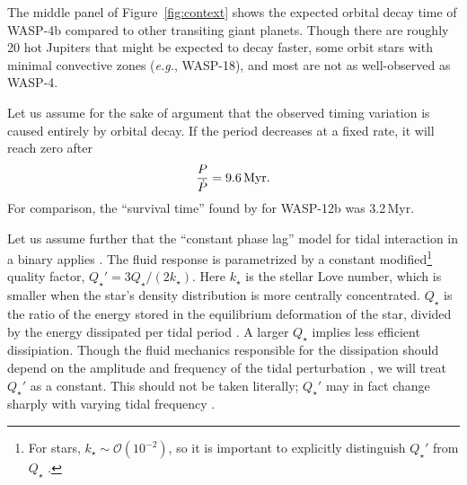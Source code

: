 \documentclass[12pt,twocolumn,tighten]{aastex62}
\begin{document}
The middle panel of Figure~\ref{fig:context} shows the expected
orbital decay time of WASP-4b compared to other transiting giant
planets.  Though there are roughly 20 hot Jupiters that might be
expected to decay faster, some orbit stars with minimal convective zones
({\it e.g.}, WASP-18), and most are not as well-observed as
WASP-4.

Let us assume for the sake of argument that the observed timing
variation is caused entirely by orbital decay.  If the period
decreases at a fixed rate, it will reach zero after
\begin{equation}
  \frac{P}{ \dot{P} } = 9.6 \, {\rm Myr}.
\end{equation}
For comparison, the ``survival time'' found by \citet{patra_2017} for
WASP-12b was 3.2\,Myr.

Let us assume further that the 
``constant phase lag'' model for tidal interaction in
a binary applies \citep{zahn_tidal_1977}.
The fluid response is parametrized by a constant modified\footnote{For
stars, $k_\star \sim \mathcal{O}(10^{-2})$, so it is important to
explicitly distinguish $Q_\star'$ from $Q_\star$ \citep[{\it
e.g.},][]{schwarzschild_structure_1958}.} quality factor, $Q_\star' =
3 Q_\star / (2k_\star)$.  Here $k_\star$ is the stellar Love number,
which is smaller when the star's density distribution is more
centrally concentrated. $Q_\star$ is the ratio of the
energy stored in the equilibrium deformation of the star, divided by
the energy dissipated per tidal period \citep[{\it
e.g.},][]{goldreich_q_1966}.  A larger $Q_\star$ implies less
efficient dissipiation.  Though the fluid mechanics responsible for
the dissipation should depend on the amplitude and frequency of
the tidal perturbation \citep[][Section~3.3]{ogilvie_tidal_2014}, we
will treat $Q_\star'$ as a constant.  This should not be taken
literally; $Q_\star'$ may in fact change sharply with varying tidal
frequency \citep{penev_empirical_2018}.
\end{document}
